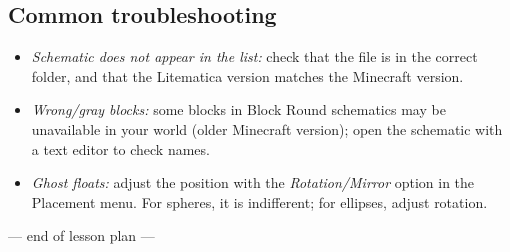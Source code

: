 \documentclass[12pt,a4paper]{scrartcl}
\begin{document}
\subsection{Common troubleshooting}
\begin{itemize}[leftmargin=1.3em,itemsep=0.15em,topsep=0.3em,nosep]
  \item \emph{Schematic does not appear in the list:} check that the file is in the correct folder, and that the Litematica version matches the Minecraft version.
  \item \emph{Wrong/gray blocks:} some blocks in Block Round schematics may be unavailable in your world (older Minecraft version); open the schematic with a text editor to check names.
  \item \emph{Ghost floats:} adjust the position with the \emph{Rotation/Mirror} option in the Placement menu. For spheres, it is indifferent; for ellipses, adjust rotation.
\end{itemize}

\vspace{2em}
\begin{center}
\color{muted}\small\sffamily
--- end of lesson plan ---
\end{center}
\end{document}
